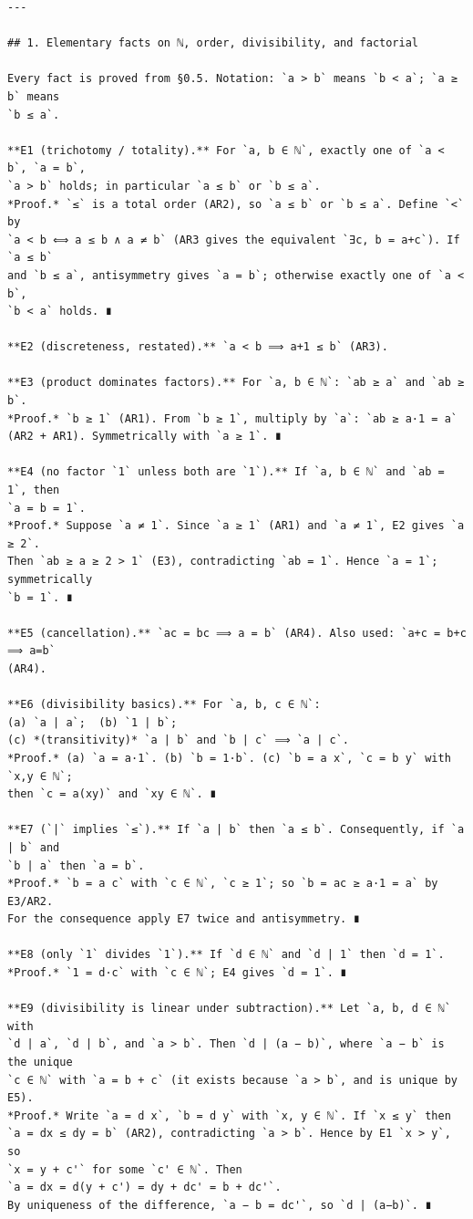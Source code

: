\documentclass[11pt]{article}
\begin{document}
\begin{verbatim}
---

## 1. Elementary facts on ℕ, order, divisibility, and factorial

Every fact is proved from §0.5. Notation: `a > b` means `b < a`; `a ≥ b` means
`b ≤ a`.

**E1 (trichotomy / totality).** For `a, b ∈ ℕ`, exactly one of `a < b`, `a = b`,
`a > b` holds; in particular `a ≤ b` or `b ≤ a`.
*Proof.* `≤` is a total order (AR2), so `a ≤ b` or `b ≤ a`. Define `<` by
`a < b ⟺ a ≤ b ∧ a ≠ b` (AR3 gives the equivalent `∃c, b = a+c`). If `a ≤ b`
and `b ≤ a`, antisymmetry gives `a = b`; otherwise exactly one of `a < b`,
`b < a` holds. ∎

**E2 (discreteness, restated).** `a < b ⟹ a+1 ≤ b` (AR3).

**E3 (product dominates factors).** For `a, b ∈ ℕ`: `ab ≥ a` and `ab ≥ b`.
*Proof.* `b ≥ 1` (AR1). From `b ≥ 1`, multiply by `a`: `ab ≥ a·1 = a`
(AR2 + AR1). Symmetrically with `a ≥ 1`. ∎

**E4 (no factor `1` unless both are `1`).** If `a, b ∈ ℕ` and `ab = 1`, then
`a = b = 1`.
*Proof.* Suppose `a ≠ 1`. Since `a ≥ 1` (AR1) and `a ≠ 1`, E2 gives `a ≥ 2`.
Then `ab ≥ a ≥ 2 > 1` (E3), contradicting `ab = 1`. Hence `a = 1`; symmetrically
`b = 1`. ∎

**E5 (cancellation).** `ac = bc ⟹ a = b` (AR4). Also used: `a+c = b+c ⟹ a=b`
(AR4).

**E6 (divisibility basics).** For `a, b, c ∈ ℕ`:
(a) `a | a`;  (b) `1 | b`;
(c) *(transitivity)* `a | b` and `b | c` ⟹ `a | c`.
*Proof.* (a) `a = a·1`. (b) `b = 1·b`. (c) `b = a x`, `c = b y` with `x,y ∈ ℕ`;
then `c = a(xy)` and `xy ∈ ℕ`. ∎

**E7 (`|` implies `≤`).** If `a | b` then `a ≤ b`. Consequently, if `a | b` and
`b | a` then `a = b`.
*Proof.* `b = a c` with `c ∈ ℕ`, `c ≥ 1`; so `b = ac ≥ a·1 = a` by E3/AR2.
For the consequence apply E7 twice and antisymmetry. ∎

**E8 (only `1` divides `1`).** If `d ∈ ℕ` and `d | 1` then `d = 1`.
*Proof.* `1 = d·c` with `c ∈ ℕ`; E4 gives `d = 1`. ∎

**E9 (divisibility is linear under subtraction).** Let `a, b, d ∈ ℕ` with
`d | a`, `d | b`, and `a > b`. Then `d | (a − b)`, where `a − b` is the unique
`c ∈ ℕ` with `a = b + c` (it exists because `a > b`, and is unique by E5).
*Proof.* Write `a = d x`, `b = d y` with `x, y ∈ ℕ`. If `x ≤ y` then
`a = dx ≤ dy = b` (AR2), contradicting `a > b`. Hence by E1 `x > y`, so
`x = y + c'` for some `c' ∈ ℕ`. Then
`a = dx = d(y + c') = dy + dc' = b + dc'`.
By uniqueness of the difference, `a − b = dc'`, so `d | (a−b)`. ∎


\end{verbatim}
\end{document}

